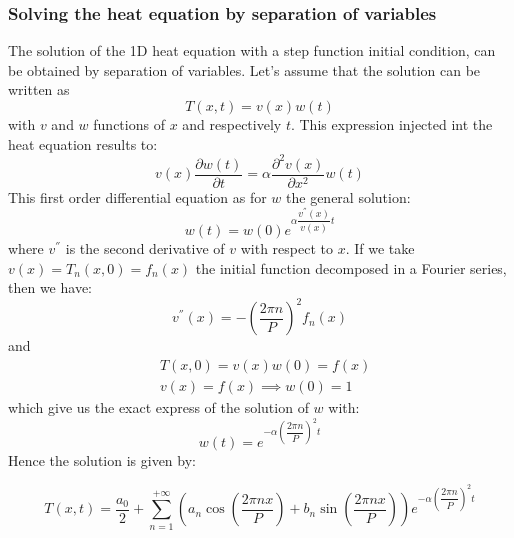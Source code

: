 \documentclass[sn-basic, Numbered]{sn-jnl}
\begin{document}
\subsubsection{Solving the heat equation by separation of variables}

The solution of the 1D heat equation  with a step function initial condition, can be obtained by separation of variables. Let's assume that the solution can be written as
\begin{equation}
    T(x, t) = v(x)w(t)
\end{equation}
with $v$ and $w$ functions of $x$ and respectively $t$. This expression injected int the heat equation results to:
\begin{equation}
   v(x) \dfrac{\partial w(t)}{\partial t} = \alpha  \dfrac{\partial^2 v(x)}{\partial x^2} w(t)
\end{equation}
This first order differential equation as for $w$ the general solution:
\begin{equation}
    w(t) = w(0) e^{\alpha \dfrac{v^{''}(x)}{v(x)} t}
\end{equation}
where $v^{''}$ is the second derivative of $v$ with respect to $x$. If we take $v(x) = T_n(x, 0) = f_n(x)$ the initial function decomposed in 
a Fourier series, then we have:
\begin{equation}
        v^{''}(x) = -\left(\frac{2 \pi n}{P} \right)^2 f_n(x)
\end{equation} 
and 
\begin{align*}
    & T(x, 0) = v(x)w(0) = f(x) \\
    & v(x) = f(x) \implies w(0) = 1
\end{align*}
which give us the exact express of the solution of $w$ with:
\begin{equation}
    w(t) = e^{-\alpha \left(\dfrac{2 \pi n}{P} \right)^2 t}
\end{equation}
Hence the solution is given by:

\begin{equation}
    T(x, t) = \frac{a_0}{2} + \sum_{n=1}^{+\infty} \left(a_n \cos\left(\frac{2\pi n x}{P}\right) + b_n \sin\left(\frac{2\pi n x}{P}\right) \right)  e^{-\alpha \left(\dfrac{2 \pi n}{P} \right)^2 t}
\end{equation}



%
%
\end{document}
